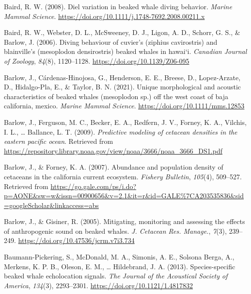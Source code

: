 \documentclass[
]{article}
\newlength{\cslhangindent}
\newlength{\cslentryspacingunit} %
\newenvironment{CSLReferences}[2] %
 {%
  \setlength{\parindent}{0pt}
  \ifodd #1
  \let\oldpar\par
  \def\par{\hangindent=\cslhangindent\oldpar}
  \fi
  \setlength{\parskip}{#2\cslentryspacingunit}
 }%
 {}
\begin{document}
\begin{CSLReferences}{1}{0}
\leavevmode{}%
Baird, R. W. (2008). Diel variation in beaked whale diving behavior.
\emph{Marine Mammal Science}.
\url{https://doi.org/10.1111/j.1748-7692.2008.00211.x}

\leavevmode{}%
Baird, R. W., Webster, D. L., McSweeney, D. J., Ligon, A. D., Schorr, G.
S., \& Barlow, J. (2006). Diving behaviour of cuvier{'}s (ziphius
cavirostris) and blainville{'}s (mesoplodon densirostris) beaked whales
in hawai{`}i. \emph{Canadian Journal of Zoology}, \emph{84}(8),
1120--1128. \url{https://doi.org/10.1139/Z06-095}

\leavevmode{}%
Barlow, J., Cárdenas-Hinojosa, G., Henderson, E. E., Breese, D.,
Lopez-Arzate, D., Hidalgo-Pla, E., \& Taylor, B. N. (2021). Unique
morphological and acoustic characteristics of beaked whales (mesoplodon
sp.) off the west coast of baja california, mexico. \emph{Marine Mammal
Science}. \url{https://doi.org/10.1111/mms.12853}

\leavevmode{}%
Barlow, J., Ferguson, M. C., Becker, E. A., Redfern, J. V., Forney, K.
A., Vilchis, I. L., \ldots{} Ballance, L. T. (2009). \emph{Predictive
modeling of cetacean densities in the eastern pacific ocean}. Retrieved
from
\url{https://repository.library.noaa.gov/view/noaa/3666/noaa_3666_DS1.pdf}

\leavevmode{}%
Barlow, J., \& Forney, K. A. (2007). Abundance and population density of
cetaceans in the california current ecosystem. \emph{Fishery Bulletin},
\emph{105}(4), 509--527. Retrieved from
\url{https://go.gale.com/ps/i.do?p=AONE\&sw=w\&issn=00900656\&v=2.1\&it=r\&id=GALE\%7CA203535836\&sid=googleScholar\&linkaccess=abs}

\leavevmode{}%
Barlow, J., \& Gisiner, R. (2005). Mitigating, monitoring and assessing
the effects of anthropogenic sound on beaked whales. \emph{J. Cetacean
Res. Manage.}, \emph{7}(3), 239--249.
\url{https://doi.org/10.47536/jcrm.v7i3.734}

\leavevmode{}%
Baumann-Pickering, S., McDonald, M. A., Simonis, A. E., Solsona Berga,
A., Merkens, K. P. B., Oleson, E. M., \ldots{} Hildebrand, J. A. (2013).
Species-specific beaked whale echolocation signals. \emph{The Journal of
the Acoustical Society of America}, \emph{134}(3), 2293--2301.
\url{https://doi.org/10.1121/1.4817832}


\end{CSLReferences}
\end{document}
